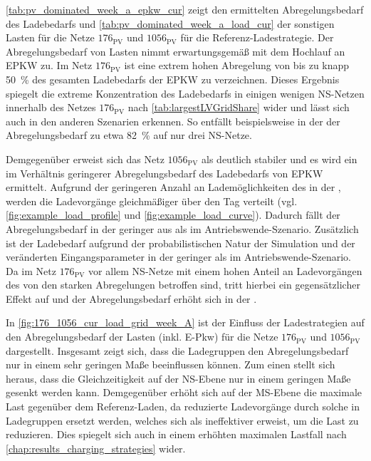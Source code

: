 



\autoref{tab:pv_dominated_week_a_epkw_cur} zeigt den ermittelten Abregelungsbedarf des Ladebedarfs und \autoref{tab:pv_dominated_week_a_load_cur} der sonstigen Lasten für die Netze \(176_{\text{PV}}\) und \(1056_{\text{PV}}\) für die Referenz-Ladestrategie.
Der Abregelungsbedarf von Lasten nimmt erwartungsgemäß mit dem Hochlauf an \gls{EPKW} zu.
Im Netz \(176_{\text{PV}}\) ist eine extrem hohen Abregelung von bis zu knapp \SI{50}{\percent} des gesamten Ladebedarfs der \gls{EPKW} zu verzeichnen.
Dieses Ergebnis spiegelt die extreme Konzentration des Ladebedarfs in einigen wenigen \gls{NS}-Netzen innerhalb des Netzes \(176_{\text{PV}}\) nach \autoref{tab:largestLVGridShare} wider und lässt sich auch in den anderen Szenarien erkennen.
So entfällt beispielsweise in der \SzeFirmenparkplatz der Abregelungsbedarf zu etwa \SI{82}{\percent} auf nur drei \gls{NS}-Netze.\medskip

Demgegenüber erweist sich das Netz \(1056_{\text{PV}}\) als deutlich stabiler und es wird ein im Verhältnis geringerer Abregelungsbedarf des Ladebedarfs von \gls{EPKW} ermittelt.
Aufgrund der geringeren Anzahl an Lademöglichkeiten des \UC \Firmeparkplatz in der \SzeFirmenparkplatzdot, werden die Ladevorgänge gleichmäßiger über den Tag verteilt (vgl. \autoref{fig:example_load_profile} und \autoref{fig:example_load_curve}).
Dadurch fällt der Abregelungsbedarf in der \SzeFirmenparkplatz geringer aus als im Antriebswende-Szenario.
Zusätzlich ist der Ladebedarf aufgrund der probabilistischen Natur der Simulation und der veränderten Eingangsparameter in der \SzeFirmenparkplatz geringer als im Antriebswende-Szenario.
Da im Netz \(176_{\text{PV}}\) vor allem \gls{NS}-Netze mit einem hohen Anteil an Ladevorgängen des \UC \zH von den starken Abregelungen betroffen sind, tritt hierbei ein gegensätzlicher Effekt auf und der Abregelungsbedarf erhöht sich in der \SzeFirmenparkplatzdot.





In \autoref{fig:176_1056_cur_load_grid_week_A} ist der Einfluss der Ladestrategien auf den Abregelungsbedarf der Lasten (inkl. E-Pkw) für die Netze \(176_{\text{PV}}\) und \(1056_{\text{PV}}\) dargestellt.
Insgesamt zeigt sich, dass die Ladegruppen den Abregelungsbedarf nur in einem sehr geringen Maße beeinflussen können.
Zum einen stellt sich heraus, dass die Gleichzeitigkeit auf der \gls{NS}-Ebene nur in einem geringen Maße gesenkt werden kann.
Demgegenüber erhöht sich auf der \gls{MS}-Ebene die maximale Last gegenüber dem Referenz-Laden, da reduzierte Ladevorgänge durch solche in Ladegruppen ersetzt werden, welches sich als ineffektiver erweist, um die Last zu reduzieren.
Dies spiegelt sich auch in einem erhöhten maximalen Lastfall nach \autoref{chap:results_charging_strategies} wider.

